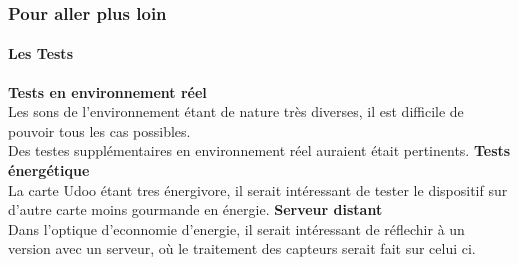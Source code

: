\documentclass{beamer}
\begin{document}
\begin{frame}
\frametitle{Pour aller plus loin}
\framesubtitle{Les Tests}
\textbf{Tests en environnement réel}\\
Les sons de l'environnement étant de nature très diverses, il est difficile de pouvoir tous les cas possibles.\\
Des testes supplémentaires en environnement réel auraient était pertinents.
\newline
\newline
\textbf{Tests énergétique}\\
La carte Udoo étant tres énergivore, il serait intéressant de tester le dispositif sur d'autre carte moins gourmande en énergie.
\newline
\newline
\textbf{Serveur distant}\\
Dans l'optique d'econnomie d'energie, il serait intéressant de réflechir à un version avec un serveur, où le traitement des capteurs serait fait sur celui ci.
\end{frame}
\end{document}
